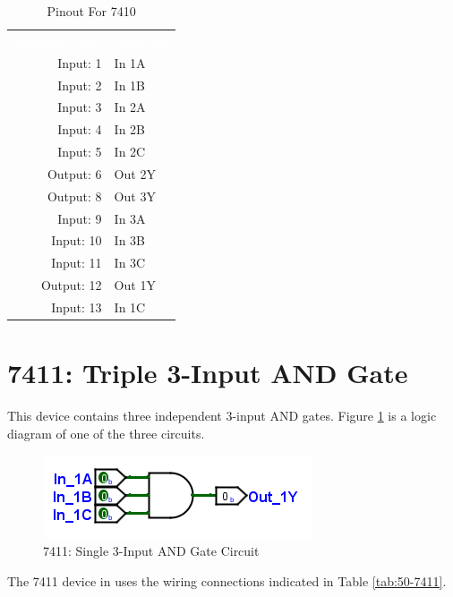 \begin{table}[H]
	\sffamily
	\newcommand{\head}[1]{\textcolor{white}{\textbf{#1}}}		
	\begin{center}
		\begin{tabular}{rl} 
			\rowcolor{black!75}
			\head{Logisim Label} & \head{Function} \\
			Input: 1   & In 1A  \\
			Input: 2   & In 1B  \\
			Input: 3   & In 2A \\
			Input: 4   & In 2B  \\
			Input: 5   & In 2C  \\
			Output: 6  & Out 2Y \\
			Output: 8  & Out 3Y \\
			Input: 9   & In 3A  \\
			Input: 10  & In 3B  \\
			Input: 11  & In 3C \\
			Output: 12 & Out 1Y  \\
			Input: 13  & In 1C  \\
		\end{tabular}
	\end{center}
	\caption{Pinout For 7410}
	\label{tab:50-7410}
\end{table}

\section{7411: Triple 3-Input AND Gate}

This device contains three independent 3-input AND gates. Figure \ref{fig:app_ttl-7411} is a logic diagram of one of the three circuits.

\begin{figure}[H]
	\centering
	\includegraphics{gfx/app_ttl-7411}
	\caption{7411: Single 3-Input AND Gate Circuit}
	\label{fig:app_ttl-7411}
\end{figure}

The 7411 device in \LE uses the wiring connections indicated in Table \ref{tab:50-7411}.

